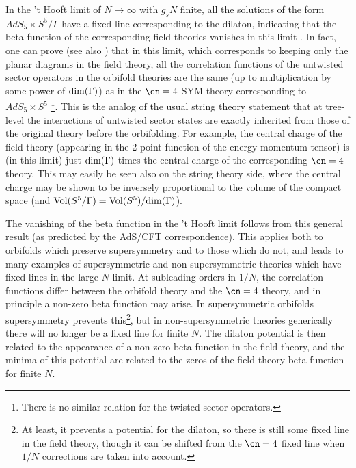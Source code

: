 In the 't Hooft limit of $N \to \infty$ with $g_s N$ finite, all the
solutions of the form $AdS_5\times S^5/\Gamma$ have a fixed line
corresponding to the dilaton, indicating that the beta function of the
corresponding field theories vanishes in this limit
\cite{Kachru:1998ys}. In fact, one can prove 
\cite{Lawrence:1998ja,Bershadsky:1998mb,Bershadsky:1998cb} (see also
\cite{Schmaltz:1999bg,Erlich:1998gb}) that in this
limit, which corresponds to keeping only the planar diagrams in the
field theory, all the correlation functions of the untwisted sector
operators in the orbifold theories are the same (up to multiplication by
some power of ${\rm dim}(\Gamma)$) as in the $\cn=4$ SYM theory
corresponding to $AdS_5\times S^5$ \footnote{There is no similar relation for
the twisted sector operators.}. This is the analog of the usual
string theory statement that at tree-level the interactions of
untwisted sector states are exactly inherited from those of the
original theory before the orbifolding. For example, the central
charge of the field theory (appearing in the 2-point function of the
energy-momentum tensor) is (in this limit) just ${\rm dim}(\Gamma)$
times the central charge of the corresponding $\cn=4$ theory. This may
easily be seen also on the string theory side, where the central
charge may be shown \cite{Gubser:1999vd} to be inversely proportional
to the volume of the compact space (and ${\rm Vol}(S^5/\Gamma) = {\rm
Vol}(S^5)/{\rm dim}(\Gamma)$).

The vanishing of the beta function in the 't Hooft limit follows from
this general result (as predicted by the AdS/CFT correspondence). This
applies both to orbifolds which preserve supersymmetry and to those
which do not, and leads to many examples of supersymmetric and
non-supersymmetric theories which have fixed lines in the large $N$
limit. At subleading orders in $1/N$, the correlation functions
differ between the orbifold theory and the $\cn=4$ theory, and in
principle a non-zero beta function may arise. In supersymmetric
orbifolds supersymmetry prevents this\footnote{At least, it prevents a
potential for the dilaton, so there is still some fixed line in the
field theory, though it can be shifted from the $\cn=4$ fixed line
when $1/N$ corrections are taken into account.}, but in
non-supersymmetric theories generically there will no longer be a
fixed line for finite $N$. The dilaton potential is then related to
the appearance of a non-zero beta function in the field theory, and
the minima of this potential are related to the zeros of the field
theory beta function for finite $N$.

